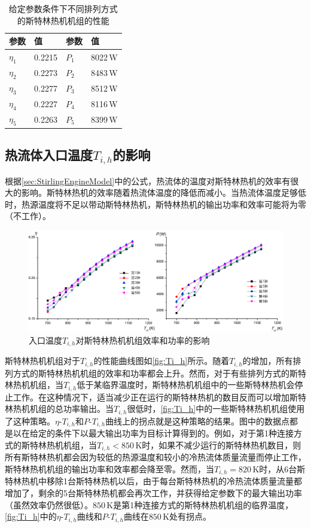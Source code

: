 \begin{table}[htbp]
	\caption{给定参数条件下不同排列方式的斯特林热机机组的性能}
	\centering
	\begin{tabular}{p{2cm}<{\centering} p{2.5cm}<{\centering} p{2cm}<{\centering} p{2.5cm}<{\centering}}
		\toprule
		参数		&	值	&	参数		&	值\\
		\midrule
		$\eta_1$	&	0.2215	&	$P_1$		&	8022\,W\\
		$\eta_2$	&	0.2273	&	$P_2$		&	8483\,W\\
		$\eta_3$	&	0.2277	&	$P_3$		&	8512\,W\\
		$\eta_4$	&	0.2227	&	$P_4$		&	8116\,W\\
		$\eta_5$	&	0.2263	&	$P_5$		&	8399\,W\\		
		\bottomrule
	\end{tabular}
	\label{tab:result}
\end{table}

\subsection{热流体入口温度$T_{i,h}$的影响}
\label{sec:T_i_h}
根据\autoref{sec:StirlingEngineModel}中的公式，热流体的温度对斯特林热机的效率有很大的影响。斯特林热机的效率随着热流体温度的降低而减小。当热流体温度足够低时，热源温度将不足以带动斯特林热机，斯特林热机的输出功率和效率可能将为零（不工作）。
\begin{figure}[htpb]
\centering
	\includegraphics[width = 0.95\columnwidth]{fig/T_ih}
	\caption{入口温度$T_{i,h}$对斯特林热机机组效率和功率的影响}
	\label{fig:Ti_h}
\end{figure}
斯特林热机机组对于$T_{i,h}$的性能曲线图如\autoref{fig:Ti_h}所示。随着$T_{i,h}$的增加，所有排列方式的斯特林热机机组的效率和功率都会上升。然而，对于有些排列方式的斯特林热机机组，当$T_{i,h}$低于某临界温度时，斯特林热机机组中的一些斯特林热机会停止工作。在这种情况下，适当减少正在运行的斯特林热机的数目反而可以增加斯特林热机机组的总功率输出。当$T_{i,h}$很低时，\autoref{fig:Ti_h}中的一些斯特林热机机组使用了这种策略。$\eta$-$T_{i,h}$和$P$-$T_{i,h}$曲线上的拐点就是这种策略的结果。图中的数据点都是以在给定的条件下以最大输出功率为目标计算得到的。例如，对于第1种连接方式的斯特林热机机组，当$T_{i,h} < 850\,\mathrm{K}$时，如果不减少运行的斯特林热机数目，则所有斯特林热机都会因为较低的热源温度和较小的冷热流体质量流量而停止工作，斯特林热机机组的输出功率和效率都会降至零。然而，当$T_{i,h} = 820\,\mathrm{K}$时，从6台斯特林热机中移除1台斯特林热机以后，由于每台斯特林热机的冷热流体质量流量都增加了，剩余的5台斯特林热机都会再次工作，并获得给定参数下的最大输出功率（虽然效率仍然很低）。$850\,\mathrm{K}$是第1种连接方式的斯特林热机机组的临界温度，\autoref{fig:Ti_h}中的$\eta$-$T_{i,h}$曲线和$P$-$T_{i,h}$曲线在$850\,\mathrm{K}$处有拐点。

